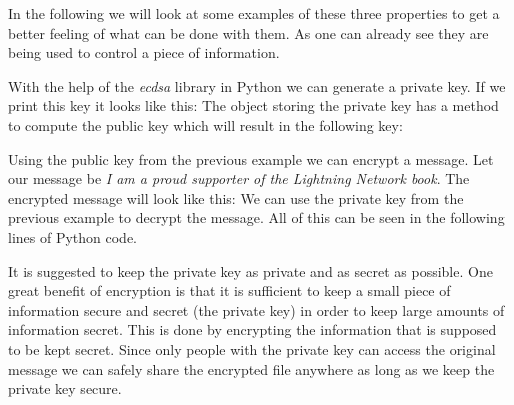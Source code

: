 \documentclass[a4paper,12pt,oneside,openany]{book}
\begin{document}

In the following we will look at some examples of these three properties
to get a better feeling of what can be done with them.  As one can
already see they are being used to control a piece of information.

   With the help of the \textit{ecdsa}
library in Python we can generate a private key.  If we print this key
it looks like this:  The object storing the private key
has a method to compute the public key which will result in the
following key: 

 Using the public key from the
previous example we can encrypt a message.  Let our message be \textit{I
  am a proud supporter of the Lightning Network book}.  The encrypted
message will look like this:  We can use the private
key from the previous example to decrypt the message.  All of this can
be seen in the following lines of Python code.


It is suggested to keep the private key as private and as secret as
possible.  One great benefit of encryption is that it is sufficient to
keep a small piece of information secure and secret (the private key) in
order to keep large amounts of information secret.  This is done by
encrypting the information that is supposed to be kept secret.  Since
only people with the private key can access the original message we can
safely share the encrypted file anywhere as long as we keep the private
key secure.
\end{document}
